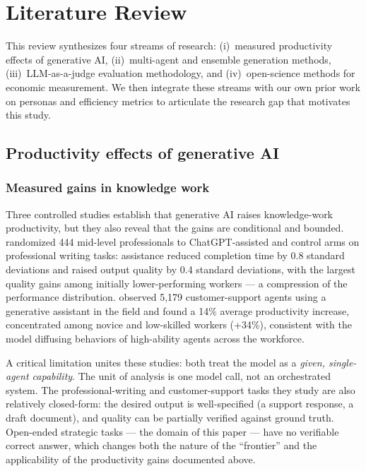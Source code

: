 \documentclass[12pt,a4paper]{article}
\begin{document}
\section{Literature Review}\label{sec:lit}

This review synthesizes four streams of research: (i)~measured productivity
effects of generative AI, (ii)~multi-agent and ensemble generation methods,
(iii)~LLM-as-a-judge evaluation methodology, and (iv)~open-science methods for
economic measurement. We then integrate these streams with our own prior work on
personas and efficiency metrics to articulate the research gap that motivates
this study.

\subsection{Productivity effects of generative AI}

\subsubsection{Measured gains in knowledge work}

Three controlled studies establish that generative AI raises knowledge-work
productivity, but they also reveal that the gains are conditional and bounded.
\citet{NoyZhang2023} randomized 444 mid-level professionals to ChatGPT-assisted
and control arms on professional writing tasks: assistance reduced completion
time by 0.8 standard deviations and raised output quality by 0.4 standard
deviations, with the largest quality gains among initially lower-performing
workers --- a compression of the performance distribution.
\citet{BrynjolfssonLiRaymond2023} observed 5{,}179 customer-support agents
using a generative assistant in the field and found a 14\% average productivity
increase, concentrated among novice and low-skilled workers (+34\%), consistent
with the model diffusing behaviors of high-ability agents across the workforce.

A critical limitation unites these studies: both treat the model as a
\emph{given, single-agent capability}. The unit of analysis is one model call,
not an orchestrated system. The professional-writing and customer-support tasks
they study are also relatively closed-form: the desired output is
well-specified (a support response, a draft document), and quality can be
partially verified against ground truth. Open-ended strategic tasks --- the
domain of this paper --- have no verifiable correct answer, which changes both
the nature of the ``frontier'' and the applicability of the productivity gains
documented above.
\end{document}
